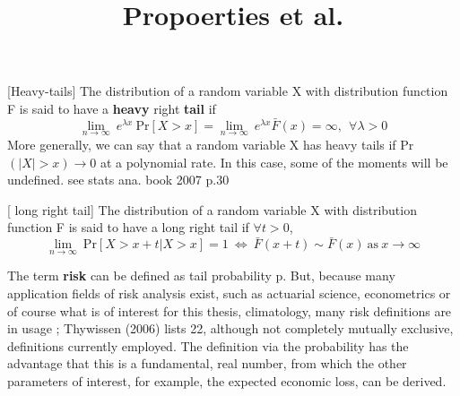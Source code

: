 \documentclass[11pt,a4paper]{book}
\title{Propoerties et al.}
\begin{document}
[Heavy-tails] The distribution of a random variable X with distribution function F is said to have a \textbf{heavy} right \textbf{tail} if 
\begin{equation}
\displaystyle{\lim_{n \to \infty}} \ e^{\lambda x} \ \text{Pr}[X>x]=\displaystyle{\lim_{n \to \infty}} \ e^{\lambda x} \bar{F}(x)=\infty , \ \ \forall \lambda>0
\end{equation}
More generally, we can say that a random variable X has heavy tails if Pr$(|X|>x)\to 0$ at a polynomial rate. In this case, some of the moments will be undefined. see stats ana. book 2007 p.30

[ long right tail] 
The distribution of a random variable X with distribution function F is said to have a long right tail if $\forall t > 0$,
\begin{equation}
\displaystyle{\lim_{n \to \infty}} \ \text{Pr}[X>x+t|X>x]=1 \ \Leftrightarrow \ \bar{F}(x+t)\sim\bar{F}(x) \ \text{as} \ x\to\infty
\end{equation}


The term \textbf{risk} can be defined as tail probability p. But, because many application fields of risk analysis exist, such as actuarial science, econometrics or of course what is of interest for this thesis, climatology, many risk definitions are in usage ; Thywissen (2006) lists 22, although
not completely mutually exclusive, definitions currently employed. The definition via the probability has the advantage that this is a fundamental, real number, from which the other parameters of interest, for example, the expected economic loss, can
be derived.
\end{document}

